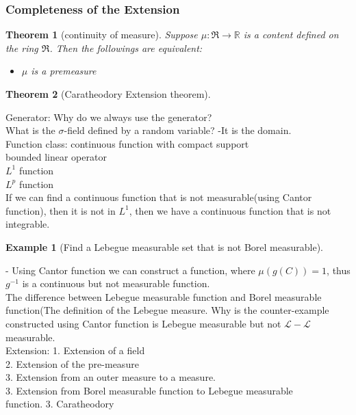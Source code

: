 \documentclass[a4paper,11pt,oneside,fleqn]{book}
\newtheorem{theorem}{Theorem}[section]
\theoremstyle{definition}
\newtheorem*{example}{Example}
\theoremstyle{remark}
\begin{document}
\subsubsection*{Completeness of the Extension}

\begin{theorem}[continuity of measure]
	Suppose $\mu : \mathfrak{R} \rightarrow \mathbb{R}$ is a content defined on the ring $\mathfrak{R}$. Then the followings are equivalent:
	\begin{itemize}
		\item $\mu$ is a premeasure
	\end{itemize}
\end{theorem}

\begin{theorem}[Caratheodory Extension theorem]
\end{theorem}

Generator: Why do we always use the generator?\\
What is the $\sigma$-field defined by a random variable? -It is the domain.\\

Function class: continuous function with compact support\\
bounded linear operator\\
$L^1$ function\\
$L^p$ function\\

If we can find a continuous function that is not measurable(using Cantor function), then it is not in $L^1$, then we have a continuous function that is not integrable.

\begin{example}[Find a Lebegue measurable set that is not Borel measurable]
\end{example}

- Using Cantor function we can construct a function, where $\mu (g(C)) = 1$, thus $g^{-1}$ is a continuous but not measurable function. \\
The difference between Lebegue measurable function and Borel measurable function(The definition of the Lebegue measure. Why is the counter-example constructed using Cantor function is Lebegue measurable but not $\mathcal{L}-\mathcal{L}$ measurable.\\
Extension:
1. Extension of a field\\
2. Extension of the pre-measure\\
3. Extension from an outer measure to a measure.\\
3. Extension from Borel measurable function to Lebegue measurable\\ function.
3. Caratheodory\\
\end{document}

